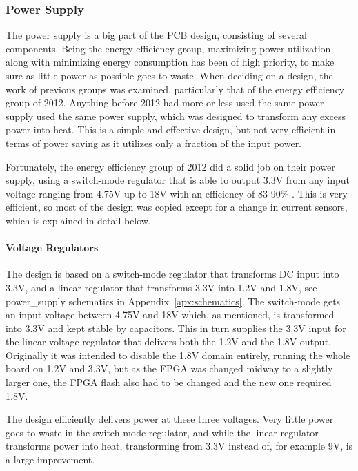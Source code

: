 
\subsubsection{Power Supply}

The power supply is a big part of the PCB design, consisting of several
components. Being the energy efficiency group, maximizing power utilization
along with minimizing energy consumption has been of high priority, to make sure
as little power as possible goes to waste. When deciding on a design, the work
of previous groups was examined, particularly that of the energy efficiency
group of 2012. Anything before 2012 had more or less used the same power supply
used the same power supply, which was designed to transform any excess power
into heat. This is a simple and effective design, but not very efficient in
terms of power saving as it utilizes only a fraction of the input power.

Fortunately, the energy efficiency group of 2012 did a solid job on their power
supply, using a switch-mode regulator that is able to output 3.3V from any input
voltage ranging from 4.75V up to 18V with an efficiency of 83-90\% . This is very efficient, so most of the design
was copied except for a change in current sensors, which is explained in detail
below.

\paragraph{Voltage Regulators}

The design is based on a switch-mode regulator that transforms DC input into
3.3V, and a linear regulator
that transforms 3.3V into 1.2V and 1.8V, see power\_supply schematics in Appendix~\ref{apx:schematics}. The switch-mode gets an input voltage between 4.75V
and 18V which, as mentioned, is transformed into 3.3V and kept stable by
capacitors. This in turn supplies the 3.3V input for the linear voltage
regulator that delivers both the 1.2V and the 1.8V output. Originally it was
intended to disable the 1.8V domain entirely, running the whole board on 1.2V
and 3.3V, but as the FPGA was changed midway to a slightly larger one, the FPGA
flash also had to be changed and the new one required 1.8V.

The design efficiently delivers power at these three voltages. Very
little power goes to waste in the switch-mode regulator, and while the linear
regulator transforms power into heat, transforming from 3.3V instead of, for
example 9V, is a large improvement.

